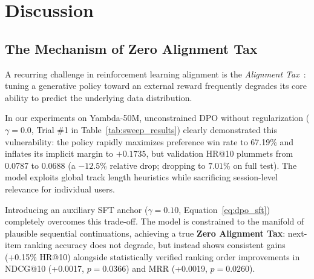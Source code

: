 \section{Discussion}
\label{sec:discussion}

\subsection{The Mechanism of Zero Alignment Tax}
A recurring challenge in reinforcement learning alignment is the \textit{Alignment Tax}~\cite{petrov2024aligning}: tuning a generative policy toward an external reward frequently degrades its core ability to predict the underlying data distribution.

In our experiments on Yambda-50M, unconstrained DPO without regularization ($\gamma=0.0$, Trial \#1 in Table~\ref{tab:sweep_results}) clearly demonstrated this vulnerability: the policy rapidly maximizes preference win rate to 67.19\% and inflates its implicit margin to $+0.1735$, but validation HR@10 plummets from 0.0787 to 0.0688 (a $-12.5\%$ relative drop; dropping to $7.01\%$ on full test). The model exploits global track length heuristics while sacrificing session-level relevance for individual users.

Introducing an auxiliary SFT anchor ($\gamma=0.10$, Equation~\ref{eq:dpo_sft}) completely overcomes this trade-off. The model is constrained to the manifold of plausible sequential continuations, achieving a true \textbf{Zero Alignment Tax}: next-item ranking accuracy does not degrade, but instead shows consistent gains (+0.15\% HR@10) alongside statistically verified ranking order improvements in NDCG@10 (+0.0017, $p = 0.0366$) and MRR (+0.0019, $p = 0.0260$).

